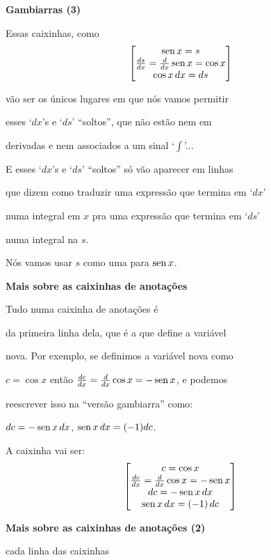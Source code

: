 \documentclass[oneside,12pt]{article}
\begin{document}
{\bf Gambiarras (3)}

Essas caixinhas, como
%
$$\left [\begin{matrix}
  \operatorname{sen} x = s \\
  \frac{ds}{dx} = \frac{d}{dx} \operatorname{sen} x = \cos x \\
  \cos x \, dx = ds \\
  \end{matrix}\right ]
$$

vão ser os únicos lugares em que nós vamos permitir

esses `$dx$'s e `$ds$' ``soltos'', que não estão nem em

derivadas e nem associados a um sinal `$∫$'...

\msk

E esses `$dx$'s e `$ds$' ``soltos'' só vão aparecer em linhas

que dizem como traduzir uma expressão que termina em `$dx$'

numa integral em $x$ pra uma expressão que termina em `$ds$'

numa integral na  $s$.

\msk

Nós vamos  usar $s$ como uma  para $\operatorname{sen} x$.


\newpage

{\bf Mais sobre as caixinhas de anotações}

Tudo numa caixinha de anotações é 

da primeira linha dela, que é a que define a variável

nova. Por exemplo, se definimos a variável nova como

$c=\cos x$ então $\frac{dc}{dx} = \frac{d}{dx} \cos x = - \operatorname{sen} x$, e podemos

reescrever isso na ``versão gambiarra'' como:

$dc = - \operatorname{sen} x \, dx$,  $\operatorname{sen} x \, dx = (-1) dc$.

\msk

A caixinha vai ser:
%
$$\left [\begin{matrix}c = \cos x \\
        \frac{dc}{dx} = \frac{d}{dx} \cos x = - \operatorname{sen} x \\
        dc = - \operatorname{sen} x \, dx \\
        \operatorname{sen} x \, dx = (-1) \, dc \\
       \end{matrix}\right ]
$$

\newpage

{\bf Mais sobre as caixinhas de anotações (2)}

 cada linha das caixinhas
\end{document}
